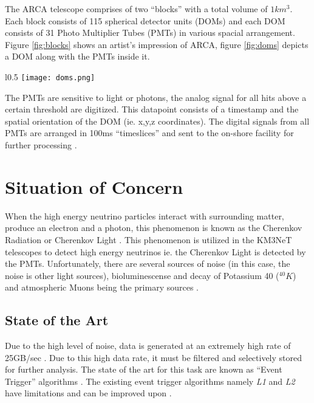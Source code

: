 The ARCA telescope comprises of two ``blocks'' with a total volume of
$1km^{3}$. Each block consists of 115 spherical detector units (DOMs)
and each DOM consists of 31 Photo Multiplier Tubes (PMTs) in various
spacial arrangement. Figure \ref{fig:blocks} shows an artist's
impression of ARCA, figure \ref{fig:doms} depicts a DOM along with the
PMTs inside it.

\begin{wrapfigure}{l}{0.5\textwidth}
  \texttt{[image: doms.png]}
  \caption{An optical detector (DOM) \textit{source: https://www.km3net.org}}%
  \label{fig:doms}
\end{wrapfigure}

The PMTs are sensitive to light or photons, the analog signal for all hits
above a certain threshold are digitized. This datapoint consists of a timestamp
and the spatial orientation of the DOM (ie. x,y,z coordinates). The digital
signals from all PMTs are arranged in 100ms ``timeslices'' and sent to the
on-shore facility for further processing \cite{aiello2019km3net}.

\section{Situation of Concern}

When the high energy neutrino particles interact with surrounding matter,
produce an electron and a photon, this phenomenon is known as the Cherenkov
Radiation or Cherenkov Light \cite{margiotta2014km3net}. This phenomenon is
utilized in the KM3NeT telescopes to detect high energy neutrinos ie. the
Cherenkov Light is detected by the PMTs. Unfortunately, there are several
sources of noise (in this case, the noise is other light sources),
bioluminescense and decay of Potassium 40 ($^{40}K$) and atmospheric Muons being
the primary sources \cite{post2019km3nnet}.

\subsection{State of the Art}\label{state-of-the-art}

Due to the high level of noise, data is generated at an extremely high rate of
25GB/sec \cite{adrian2016letter}. Due to this high data rate, it must be
filtered and selectively stored for further analysis. The state of the art for
this task are known as ``Event Trigger'' algorithms
\cite{adrian2016letter,aiello2019km3net}. The existing event trigger algorithms
namely \emph{L1} and \emph{L2} have limitations and can be improved upon
\cite{karas2019data}.


